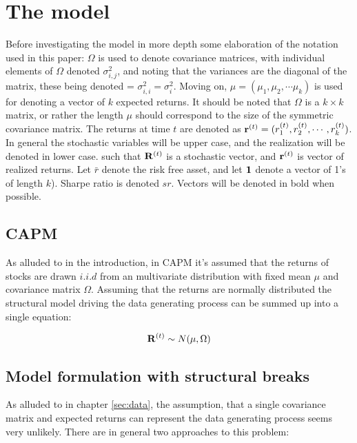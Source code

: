 \section{The model}\label{sec:model}

Before investigating the model in more depth some elaboration of the notation used in this paper: $\Omega$ is used to denote covariance matrices, with individual elements of $\Omega$ denoted $\sigma^{2}_{i,j}$, and noting that the variances are the diagonal of the matrix, these being denoted = $\sigma^{2}_{i,i} = \sigma^{2}_{i}$. Moving on,  $\mu = (\mu_1, \mu_2, \cdots \mu_{k})$ is used for denoting a vector of $k$ expected returns. It should be noted that $\Omega$ is a $k\times k$ matrix, or rather the length $\mu$ should correspond to the size of the symmetric covariance matrix. The returns at time $t$ are denoted as $\mathbf{r}^{(t)} = (r_1^{(t)}, r_2^{(t)}, \cdots, r_k^{(t)})$. In general the stochastic variables will be upper case, and the realization will be denoted in lower case. such that $\mathbf{R}^{(t)}$ is a stochastic vector, and $\mathbf{r}^{(t)}$ is vector of realized returns. Let $\bar{r}$ denote the risk free asset, and let $\mathbf{1}$ denote a vector of 1's of length $k$). Sharpe ratio is denoted $sr$. Vectors will be denoted in bold when possible.

\subsection{CAPM}

As alluded to in the introduction, in CAPM it's assumed that the returns of stocks are drawn $i.i.d$ from an multivariate distribution with fixed mean $\mu$ and covariance matrix $\Omega$. Assuming that the returns are normally distributed the structural model driving the data generating process can be summed up into a single equation:

\begin{equation}
    \mathbf{R}^{(t)} \sim N(\mu, \Omega)
\end{equation}

\subsection{Model formulation with structural breaks}

As alluded to in chapter \ref{sec:data}, the assumption, that a single covariance matrix and expected returns can represent the data generating process seems very unlikely. There are in general two approaches to this problem:

